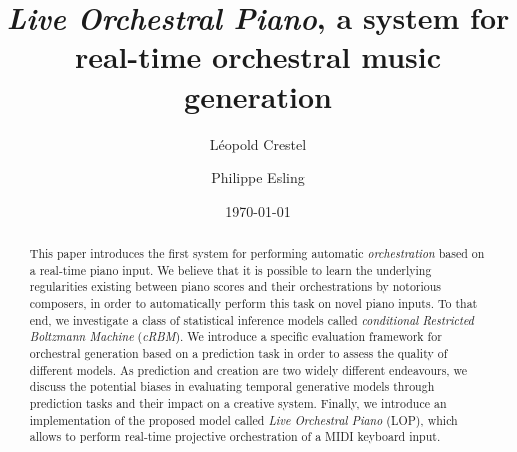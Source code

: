 \documentclass{amsart}
\begin{document}
	
	\title{\textit{Live Orchestral Piano}, a system for real-time orchestral music generation}
	
	\author{Léopold Crestel}
	\address{Représentations musicales, \textit{IRCAM}, Paris, France 750104}
	
	\author{Philippe Esling}
	\address{Représentations musicales, \textit{IRCAM}, Paris, France 750104}
	
	
	\date{\today}
	
	
	
	\begin{abstract}
	This paper introduces the first system for performing automatic \textit{orchestration} based on a real-time piano input. We believe that it is possible to learn the underlying regularities existing between piano scores and their orchestrations by notorious composers, in order to automatically perform this task on novel piano inputs. To that end, we investigate a class of statistical inference models called \textit{conditional Restricted Boltzmann Machine} (\textit{cRBM}). We introduce a specific evaluation framework for orchestral generation based on a prediction task in order to assess the quality of different models. As prediction and creation are two widely different endeavours, we discuss the potential biases in evaluating temporal generative models through prediction tasks and their impact on a creative system. Finally, we introduce an implementation of the proposed model called \textit{Live Orchestral Piano} (LOP), which allows to perform real-time projective orchestration of a MIDI keyboard input.
	\end{abstract}
	
	\maketitle
\end{document}

